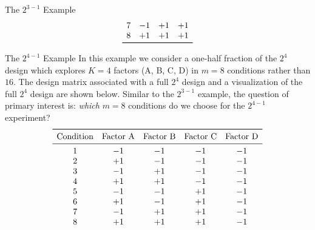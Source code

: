 \begin{itemize}
\begin{Example}{The $ 2^{3-1} $ Example}{}
\[\begin{array}{cccc}
                              7                & -1              & +1              & +1              \\
                              8                & +1              & +1              & +1              \\
                              \bottomrule
                        \end{array} \]
            \end{Example}
            \begin{Example}{The $ 2^{4-1} $ Example}{}
                  In this example we consider a one-half fraction of the $2^4$ design which
                  explores $K = 4$ factors (A, B, C, D) in $m = 8$ conditions rather than $16$. The design matrix
                  associated with a full $2^4$ design and a visualization of the full $2^4$ design are shown below. Similar
                  to the $2^{3-1}$ example, the question of primary interest is: \emph{which} $m = 8$ conditions do we choose
                  for the $2^{4-1}$ experiment?
                  \[ \begin{array}{ccccc}
                              \toprule
                              \text{Condition} & \text{Factor A} & \text{Factor B} & \text{Factor C} & \text{Factor D} \\
                              \midrule
                              1                & -1              & -1              & -1              & -1              \\
                              2                & +1              & -1              & -1              & -1              \\
                              3                & -1              & +1              & -1              & -1              \\
                              4                & +1              & +1              & -1              & -1              \\
                              5                & -1              & -1              & +1              & -1              \\
                              6                & +1              & -1              & +1              & -1              \\
                              7                & -1              & +1              & +1              & -1              \\
                              8                & +1              & +1              & +1              & -1              \\

\end{array}\]
\end{Example}
\end{itemize}
